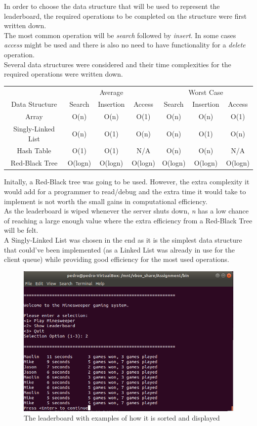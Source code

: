 In order to choose the data structure that will be used to represent the leaderboard, the required operations to be completed on the structure were first written down. 
\\
The most common operation will be \textit{search} followed by \textit{insert}. In some cases \textit{access} might be used and there is also no need to have functionality for a \textit{delete} operation. 
\\
Several data structures were considered and their time complexities for the required operations were written down.
\begin{center}
\begin{tabular}{|c|c|c|c|c|c|c|}
	\cline{1-7}
	& \multicolumn{3}{|c|}{Average} & \multicolumn{3}{|c|}{Worst Case}	\\
	\cline{1-7}
	Data Structure & Search & Insertion & Access & Search & Insertion & Access \\
	\hline
	Array				& O(n)	& O(n)	& O(1)	& O(n)	& O(n)	& O(1)	\\
	Singly-Linked List	& O(n)	& O(1)	& O(n)	& O(n)	& O(1)	& O(n)	\\
	Hash Table			& O(1)	& O(1)	& N/A	& O(n)	& O(n)	& N/A	\\
	Red-Black Tree		& O(logn) & O(logn) & O(logn) & O(logn) & O(logn) & O(logn) \\
	\hline
\end{tabular}
\end{center}
Initally, a Red-Black tree was going to be used. However, the extra complexity it would add for a programmer to read/debug and the extra time it would take to implement is not worth the small gains in computational efficiency. 
\\ 
As the leaderboard is wiped whenever the server shuts down, \textit{n} has a low chance of reaching a large enough value where the extra efficiency from a Red-Black Tree will be felt.
\\
A Singly-Linked List was chosen in the end as it is the simplest data structure that could've been implemented (as a Linked List was already in use for the client queue) while providing good efficiency for the most used operations. 
\begin{figure} [!ht]
	\centering
	\includegraphics[width=1\textwidth]{images/Leaderboard} 
	\caption{The leaderboard with examples of how it is sorted and displayed}
	\label{fig:leaderboard} 
\end{figure}